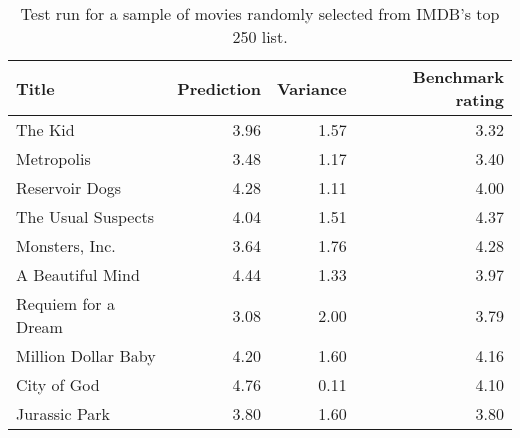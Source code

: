 \begin{table}[h]
  \begin{center}
    \begin{tabular}{|l|rr|r|}
      \hline
      \textbf{Title} & \textbf{Prediction} & \textbf{Variance} & \textbf{Benchmark rating} \\
      \hline
      The Kid             & 3.96 & 1.57 & 3.32 \\
      Metropolis          & 3.48 & 1.17 & 3.40 \\
      Reservoir Dogs      & 4.28 & 1.11 & 4.00 \\
      The Usual Suspects  & 4.04 & 1.51 & 4.37 \\
      Monsters, Inc.      & 3.64 & 1.76 & 4.28 \\
      A Beautiful Mind    & 4.44 & 1.33 & 3.97 \\
      Requiem for a Dream & 3.08 & 2.00 & 3.79 \\
      Million Dollar Baby & 4.20 & 1.60 & 4.16 \\
      City of God         & 4.76 & 0.11 & 4.10 \\
      Jurassic Park       & 3.80 & 1.60 & 3.80 \\
      \hline
    \end{tabular}
  \end{center}
  \caption{Test run for a sample of movies randomly selected from IMDB's top 250 list.}
  \label{tab:test_run_popular}
\end{table}
